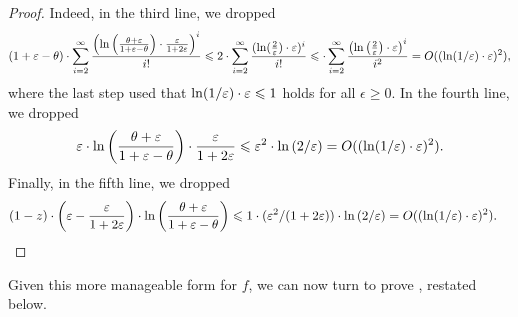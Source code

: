 \begin{proof}
	Indeed, in the third line, we dropped 
	\begin{align*}
	\left(1+ \varepsilon - \theta\right) \cdot \sum_{i=2}^\infty 
	\frac{
		\left( \ln \left(\frac{\theta+\varepsilon}{1+ \varepsilon - \theta}\right) 
		\cdot \frac{\varepsilon}{1+2\varepsilon}
		\right)^i
	}{i!} \leqslant 2\cdot \sum_{i=2}^\infty \frac{(\ln(\frac{2}{\varepsilon})\cdot \varepsilon)^i}{i!} \leqslant \cdot \sum_{i=2}^\infty \frac{\left(\ln\left(\frac{2}{\varepsilon}\right)\cdot \varepsilon\right)^i}{i^2} = O((\ln(1/\varepsilon)\cdot \varepsilon)^2),
	\end{align*} 
	where the last step used that $\ln(1/\varepsilon)\cdot \varepsilon\leqslant 1$ holds for all $\epsilon\geq 0$.
	In the fourth line, we dropped 
	\begin{align*}\varepsilon\cdot \ln\left(\frac{\theta+\varepsilon}{1+\varepsilon-\theta}\right)\cdot \frac{\varepsilon}{1+2\varepsilon} \leqslant \varepsilon^2\cdot \ln\left(2/\varepsilon\right) = O((\ln(1/\varepsilon)\cdot \varepsilon)^2).
	\end{align*}
	Finally, in the fifth line, we dropped 
	\begin{align*}
	(1-z)\cdot \left(\varepsilon-\frac{\varepsilon}{1+2\varepsilon}\right)\cdot \ln\left(\frac{\theta+\varepsilon}{1+\varepsilon-\theta}\right) & \leqslant 1\cdot (\varepsilon^2/(1+2\varepsilon))\cdot \ln\left(2/\varepsilon\right) = O((\ln(1/\varepsilon)\cdot \varepsilon)^2).\qedhere
	\end{align*} 
\end{proof}

Given this more manageable form for $f$, we can now turn to prove , restated below.

\WWproperties*

